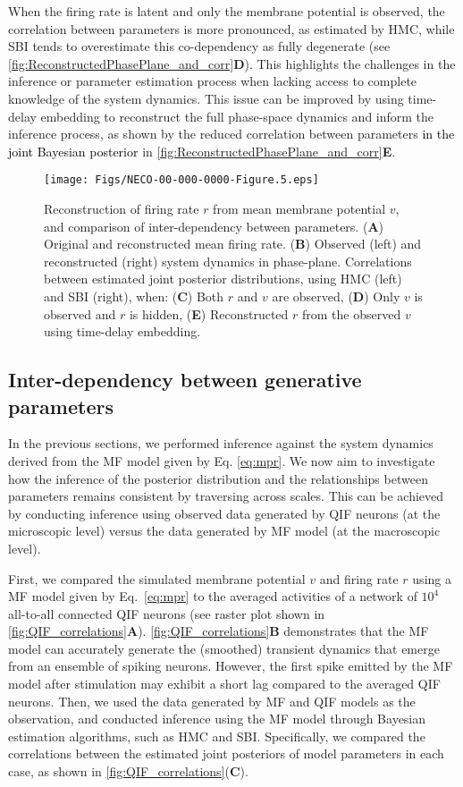 \documentclass[12pt]{article}
\begin{document}
When the firing rate is latent and only the membrane potential is observed, the correlation between parameters is more pronounced, as estimated by HMC, while SBI tends to overestimate this co-dependency as fully degenerate (see \autoref{fig:ReconstructedPhasePlane_and_corr}\textbf{D}). This highlights the challenges in the inference or parameter estimation process when lacking access to complete knowledge of the system dynamics. This issue can be improved by using time-delay embedding to reconstruct the full phase-space dynamics and inform the inference process, as shown by the reduced correlation between parameters \textcolor{black}{in the joint Bayesian posterior} in  \autoref{fig:ReconstructedPhasePlane_and_corr}\textbf{E}. 


\begin{figure}
    \centering
    \texttt{[image: Figs/NECO-00-000-0000-Figure.5.eps]}
    \caption{Reconstruction of firing rate $r$ from mean membrane potential $v$, and comparison of inter-dependency between parameters. (\textbf{A}) Original and reconstructed mean firing rate. (\textbf{B}) Observed (left) and reconstructed (right) system dynamics in phase-plane. Correlations between estimated joint posterior distributions, using HMC (left) and SBI (right), when: (\textbf{C}) Both $r$ and $v$ are observed, (\textbf{D}) Only $v$ is observed and $r$ is hidden, (\textbf{E}) Reconstructed $r$ from the observed $v$ using time-delay embedding. }
    \label{fig:ReconstructedPhasePlane_and_corr}
\end{figure}


\subsection{Inter-dependency between generative parameters}

In the previous sections, we performed inference against the system dynamics derived from the MF model given by Eq. \eqref{eq:mpr}. We now aim to investigate how the inference of the posterior distribution and the relationships between parameters remains consistent by traversing across scales. This can be achieved by conducting inference using observed data generated by QIF neurons (at the microscopic level) versus the data generated by MF model (at the macroscopic level).

First, we compared the simulated membrane potential $v$ and firing rate $r$ using a MF model given by Eq.~\eqref{eq:mpr} to the averaged activities of a network of $10^4$ all-to-all connected QIF neurons (see raster plot shown in \autoref{fig:QIF_correlations}\textbf{A}). \autoref{fig:QIF_correlations}\textbf{B} demonstrates that the MF model can accurately generate the (smoothed) transient dynamics that emerge from an ensemble of spiking neurons. However, the first spike emitted by the MF model after stimulation may exhibit a short lag compared to the averaged QIF neurons. %
Then, we used the data generated by MF and QIF models as the observation, and conducted inference using the MF model through Bayesian estimation algorithms, such as HMC and SBI. Specifically, we compared the correlations between the estimated joint posteriors of model parameters in each case, as shown in \autoref{fig:QIF_correlations}(\textbf{C}). 
\end{document}
